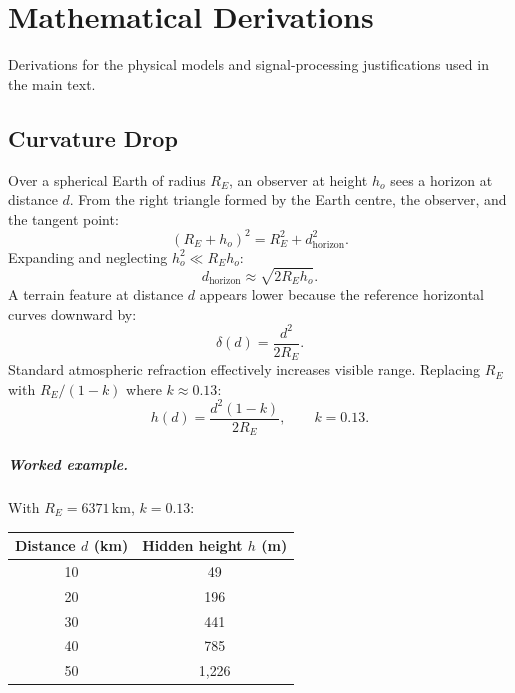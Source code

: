 \chapter{Mathematical Derivations}
\label{app:derivations}

Derivations for the physical models and signal-processing justifications used in the main text.

\section{Curvature Drop}
\label{sec:curv_derivation}

Over a spherical Earth of radius $R_E$, an observer at height $h_o$ sees a horizon at distance $d$. From the right triangle formed by the Earth centre, the observer, and the tangent point:
\begin{equation}
(R_E + h_o)^2 = R_E^2 + d_{\mathrm{horizon}}^2.
\end{equation}
\noindent Expanding and neglecting $h_o^2 \ll R_E h_o$:
\begin{equation}
d_{\mathrm{horizon}} \approx \sqrt{2 R_E h_o}.
\end{equation}
\noindent A terrain feature at distance $d$ appears lower because the reference horizontal curves downward by:
\begin{equation}
\delta(d) = \frac{d^2}{2R_E}.
\end{equation}
\noindent Standard atmospheric refraction effectively increases visible range. Replacing $R_E$ with $R_E / (1 - k)$ where $k \approx 0.13$:
\begin{equation}
h(d) = \frac{d^2(1 - k)}{2 R_E}, \qquad k = 0.13.
\end{equation}

\paragraph{Worked example.}
With $R_E = 6371$\,km, $k = 0.13$:

\begin{center}
\begin{tabular}{cc}
\toprule
Distance $d$ (km) & Hidden height $h$ (m) \\
\midrule
10 & 49 \\
20 & 196 \\
30 & 441 \\
40 & 785 \\
50 & 1{,}226 \\
\bottomrule
\end{tabular}
\end{center}

